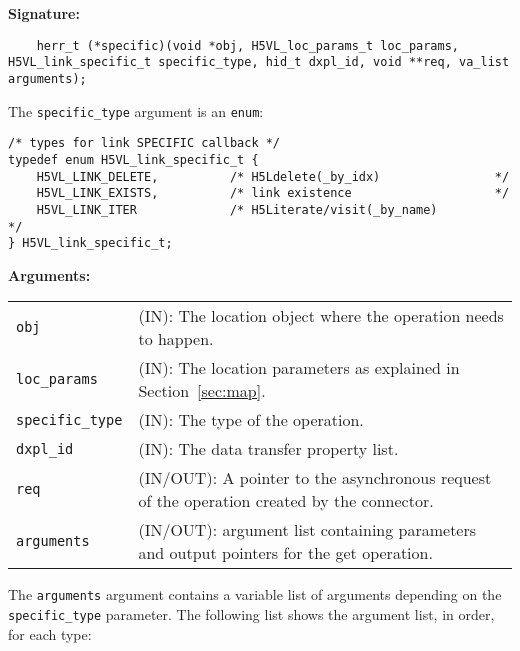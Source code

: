 \begin{mdframed}[style=bgbox]
\textbf{Signature:}
\begin{lstlisting}
	herr_t (*specific)(void *obj, H5VL_loc_params_t loc_params, H5VL_link_specific_t specific_type, hid_t dxpl_id, void **req, va_list arguments);
\end{lstlisting}

The \texttt{specific\_type} argument is an \texttt{enum}:
\begin{lstlisting}
/* types for link SPECIFIC callback */
typedef enum H5VL_link_specific_t {                                              
    H5VL_LINK_DELETE,          /* H5Ldelete(_by_idx)                */           
    H5VL_LINK_EXISTS,          /* link existence                    */           
    H5VL_LINK_ITER             /* H5Literate/visit(_by_name)              */     
} H5VL_link_specific_t; 
\end{lstlisting}

\textbf{Arguments:}\\
\begin{tabular}{l p{13.5cm}}
  \texttt{obj} & (IN): The location object  where the operation needs to happen.\\
  \texttt{loc\_params} & (IN): The location parameters as explained in Section~\ref{sec:map}.\\
  \texttt{specific\_type} & (IN): The type of the operation.\\
  \texttt{dxpl\_id} & (IN): The data transfer property list.\\
  \texttt{req} & (IN/OUT): A pointer to the asynchronous request of the
  operation created by the connector.\\
  \texttt{arguments} & (IN/OUT): argument list containing parameters and
  output pointers for the get operation. \\
\end{tabular}
\end{mdframed}

The \texttt{arguments} argument contains a variable list of arguments
depending on the \texttt{specific\_type} parameter. The following list shows
the argument list, in order, for each type:

